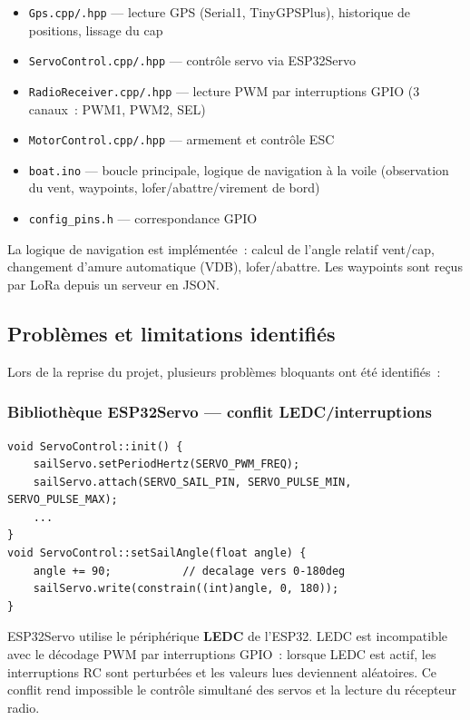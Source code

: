 \documentclass[12pt,a4paper]{article}
\newcommand{\file}[1]{\texttt{#1}}
\begin{document}
\begin{itemize}
  \item \file{Gps.cpp/.hpp} — lecture GPS (Serial1, TinyGPSPlus), historique
    de positions, lissage du cap
  \item \file{ServoControl.cpp/.hpp} — contrôle servo via ESP32Servo
  \item \file{RadioReceiver.cpp/.hpp} — lecture PWM par interruptions GPIO
    (3 canaux~: PWM1, PWM2, SEL)
  \item \file{MotorControl.cpp/.hpp} — armement et contrôle ESC
  \item \file{boat.ino} — boucle principale, logique de navigation à la voile
    (observation du vent, waypoints, lofer/abattre/virement de bord)
  \item \file{config\_pins.h} — correspondance GPIO
\end{itemize}

La logique de navigation est implémentée~: calcul de l'angle relatif vent/cap,
changement d'amure automatique (VDB), lofer/abattre. Les waypoints sont reçus
par LoRa depuis un serveur en JSON.

\subsection{Problèmes et limitations identifiés}

Lors de la reprise du projet, plusieurs problèmes bloquants ont été identifiés~:

\subsubsection{Bibliothèque ESP32Servo — conflit LEDC/interruptions}

\begin{lstlisting}[style=cpp, caption={ServoControl.cpp original -- utilisation d'ESP32Servo}]
void ServoControl::init() {
    sailServo.setPeriodHertz(SERVO_PWM_FREQ);
    sailServo.attach(SERVO_SAIL_PIN, SERVO_PULSE_MIN, SERVO_PULSE_MAX);
    ...
}
void ServoControl::setSailAngle(float angle) {
    angle += 90;           // decalage vers 0-180deg
    sailServo.write(constrain((int)angle, 0, 180));
}
\end{lstlisting}

\begin{warningbox}
  ESP32Servo utilise le périphérique \textbf{LEDC} de l'ESP32.
  LEDC est incompatible avec le décodage PWM par interruptions GPIO~:
  lorsque LEDC est actif, les interruptions RC sont perturbées et les
  valeurs lues deviennent aléatoires. Ce conflit rend impossible le
  contrôle simultané des servos et la lecture du récepteur radio.
\end{warningbox}
\end{document}
